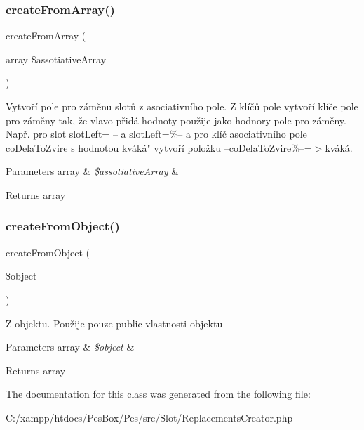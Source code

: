 \subsubsection{\texorpdfstring{create\+From\+Array()}{createFromArray()}}
{\footnotesize\ttfamily create\+From\+Array (\begin{DoxyParamCaption}\item[{array}]{\$assotiative\+Array }\end{DoxyParamCaption})}

Vytvoří pole pro záměnu slotů z asociativního pole. Z klíčů pole vytvoří klíče pole pro záměny tak, že vlavo přidá hodnoty použije jako hodnory pole pro záměny. Např. pro slot slot\+Left= \textquotesingle{}--\textquotesingle{} a slot\+Left=\textquotesingle{}\%--\textquotesingle{} a pro klíč asociativního pole co\+Dela\+To\+Zvire s hodnotou \textquotesingle{}kváká" vytvoří položku \textquotesingle{}--co\+Dela\+To\+Zvire\%--\textquotesingle{}=$>$\textquotesingle{}kváká\textquotesingle{}. 
\begin{DoxyParams}[1]{Parameters}
array & {\em \$assotiative\+Array} & \\
\hline
\end{DoxyParams}
\begin{DoxyReturn}{Returns}
array 
\end{DoxyReturn}
\mbox{\label{class_pes_1_1_slot_1_1_replacements_creator_a1257646460ed92c8cbcedd5ab45552c2}} 
\subsubsection{\texorpdfstring{create\+From\+Object()}{createFromObject()}}
{\footnotesize\ttfamily create\+From\+Object (\begin{DoxyParamCaption}\item[{}]{\$object }\end{DoxyParamCaption})}

Z objektu. Použije pouze public vlastnosti objektu 
\begin{DoxyParams}[1]{Parameters}
array & {\em \$object} & \\
\hline
\end{DoxyParams}
\begin{DoxyReturn}{Returns}
array 
\end{DoxyReturn}


The documentation for this class was generated from the following file\+:\begin{DoxyCompactItemize}
\item 
C\+:/xampp/htdocs/\+Pes\+Box/\+Pes/src/\+Slot/Replacements\+Creator.\+php\end{DoxyCompactItemize}
